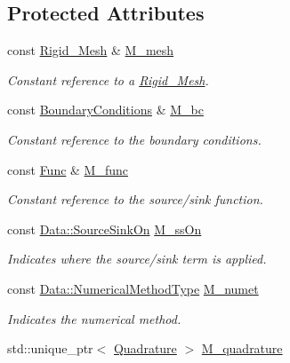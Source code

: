 \subsection*{Protected Attributes}
\begin{DoxyCompactItemize}
\item 
const \hyperlink{classFVCode3D_1_1Rigid__Mesh}{Rigid\+\_\+\+Mesh} \& \hyperlink{classFVCode3D_1_1Problem_aa3c9a2cf8ccd899314cf22d907a0041f}{M\+\_\+mesh}
\begin{DoxyCompactList}\small\item\em Constant reference to a \hyperlink{classFVCode3D_1_1Rigid__Mesh}{Rigid\+\_\+\+Mesh}. \end{DoxyCompactList}\item 
const \hyperlink{classFVCode3D_1_1BoundaryConditions}{Boundary\+Conditions} \& \hyperlink{classFVCode3D_1_1Problem_a6cfbed984a9986876230b643d6c28cee}{M\+\_\+bc}
\begin{DoxyCompactList}\small\item\em Constant reference to the boundary conditions. \end{DoxyCompactList}\item 
const \hyperlink{namespaceFVCode3D_a38fa3b2520ad364d2c3d56ea5077826a}{Func} \& \hyperlink{classFVCode3D_1_1Problem_a8d2a09d302c312ce0fadb00b8ac7ecf7}{M\+\_\+func}
\begin{DoxyCompactList}\small\item\em Constant reference to the source/sink function. \end{DoxyCompactList}\item 
const \hyperlink{classFVCode3D_1_1Data_a4d66e2e205b350cb240820540339e1a3}{Data\+::\+Source\+Sink\+On} \hyperlink{classFVCode3D_1_1Problem_ab6c92913d3fda97fa741eb2ebfa01fe6}{M\+\_\+ss\+On}
\begin{DoxyCompactList}\small\item\em Indicates where the source/sink term is applied. \end{DoxyCompactList}\item 
const \hyperlink{classFVCode3D_1_1Data_a5222e1901276af4586befd821445c6cf}{Data\+::\+Numerical\+Method\+Type} \hyperlink{classFVCode3D_1_1Problem_a2ed1b05f24ab6100c6a389e22df7e098}{M\+\_\+numet}
\begin{DoxyCompactList}\small\item\em Indicates the numerical method. \end{DoxyCompactList}\item 
std\+::unique\+\_\+ptr$<$ \hyperlink{classFVCode3D_1_1Quadrature}{Quadrature} $>$ \hyperlink{classFVCode3D_1_1Problem_ace5ff91974a55df1e4cbc6ef879f790f}{M\+\_\+quadrature}

\end{DoxyCompactItemize}
